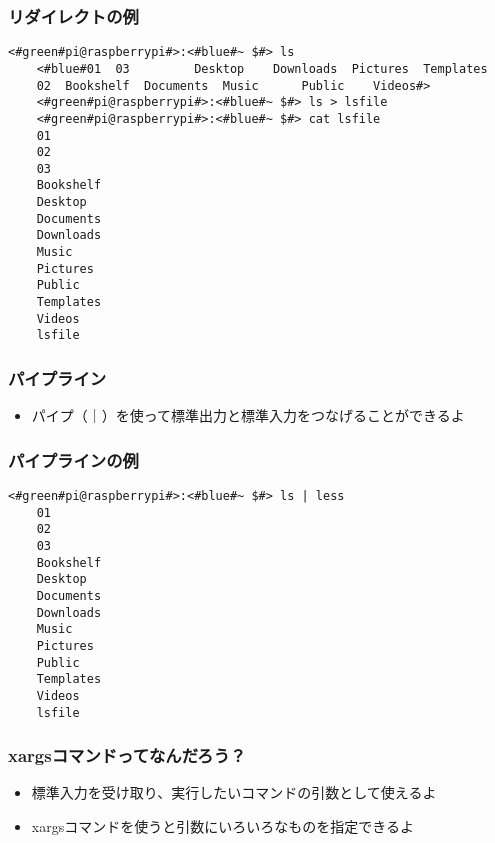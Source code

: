 \begin{frame}[fragile]
    \frametitle{リダイレクトの例}
    \begin{lstlisting}[title=lsの出力をリダイレクトする, label=redirectLs]
    <#green#pi@raspberrypi#>:<#blue#~ $#> ls 
    <#blue#01  03         Desktop    Downloads  Pictures  Templates
    02  Bookshelf  Documents  Music      Public    Videos#>
    <#green#pi@raspberrypi#>:<#blue#~ $#> ls > lsfile
    <#green#pi@raspberrypi#>:<#blue#~ $#> cat lsfile
    01
    02
    03
    Bookshelf
    Desktop
    Documents
    Downloads
    Music
    Pictures
    Public
    Templates
    Videos
    lsfile
    \end{lstlisting}
\end{frame}

\begin{frame}
    \frametitle{パイプライン}
    \begin{itemize}
        \item パイプ（｜）を使って標準出力と標準入力をつなげることができるよ
    \end{itemize}
    \begin{figure}
        \centering
        
    \end{figure}
\end{frame}

\begin{frame}[fragile]
    \frametitle{パイプラインの例}
    \begin{lstlisting}[title=lsコマンドの出力をパイプでlessコマンドに渡す, label=redirectCat]
    <#green#pi@raspberrypi#>:<#blue#~ $#> ls | less
    01
    02
    03
    Bookshelf
    Desktop
    Documents
    Downloads
    Music
    Pictures
    Public
    Templates
    Videos
    lsfile
    \end{lstlisting}
\end{frame}

\begin{frame}
    \frametitle{xargsコマンドってなんだろう？}
    \begin{itemize}
        \item 標準入力を受け取り、実行したいコマンドの引数として使えるよ
        \item xargsコマンドを使うと引数にいろいろなものを指定できるよ
    \end{itemize}
    \begin{figure}
        \centering
        
    \end{figure}
\end{frame}

